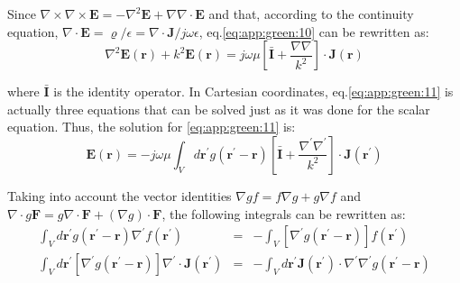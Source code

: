 			Since $\nabla\times\nabla\times\mathbf{E} = -\nabla^2\mathbf{E} + \nabla\nabla\cdot\mathbf{E}$ and that, according to the continuity equation, $\nabla\cdot\mathbf{E} = \varrho/\epsilon = \nabla\cdot\mathbf{J}/j\omega\epsilon$, eq.\eqref{eq:app:green:10} can be rewritten as:
			\begin{equation}
				\nabla^2\mathbf{E}(\mathbf{r}) + k^2\mathbf{E}(\mathbf{r}) = j\omega\mu\left[\mathbf{\bar{I}}+\frac{\nabla\nabla}{k^2}\right]\cdot\mathbf{J}(\mathbf{r}) \label{eq:app:green:11}
			\end{equation}
	
			\noindent where $\mathbf{\bar{I}}$ is the identity operator. In Cartesian coordinates, eq.\eqref{eq:app:green:11} is actually three equations that can be solved just as it was done for the scalar equation. Thus, the solution for \eqref{eq:app:green:11} is:
			\begin{equation}
				\mathbf{E}(\mathbf{r}) = -j\omega\mu\int_V d\mathbf{r^\prime} g(\mathbf{r^\prime}-\mathbf{r})\left[\mathbf{\bar{I}}+\frac{\nabla^\prime\nabla^\prime}{k^2}\right]\cdot\mathbf{J}(\mathbf{r^\prime}) \label{eq:app:green:12}
			\end{equation}
	
			Taking into account the vector identities $\nabla gf = f\nabla g + g\nabla f$ and $\nabla\cdot g\mathbf{F} = g\nabla\cdot\mathbf{F} + (\nabla g)\cdot\mathbf{F}$, the following integrals can be rewritten as:
			\begin{eqnarray}
				\int_V d\mathbf{r^\prime} g(\mathbf{r^\prime}-\mathbf{r})\nabla^\prime f(\mathbf{r^\prime}) &=& - \int_V \left[\nabla^\prime g(\mathbf{r^\prime}-\mathbf{r})\right]f(\mathbf{r^\prime}) \label{eq:app:green:13} \\
				 \int_V d\mathbf{r^\prime} \left[\nabla^\prime g(\mathbf{r^\prime}-\mathbf{r})\right]\nabla^\prime\cdot\mathbf{J}(\mathbf{r^\prime}) &=& -\int_V d\mathbf{r}^\prime\mathbf{J}(\mathbf{r^\prime})\cdot\nabla^\prime\nabla^\prime g(\mathbf{r^\prime}-\mathbf{r}) \label{eq:app:green:14}
			\end{eqnarray}
	
